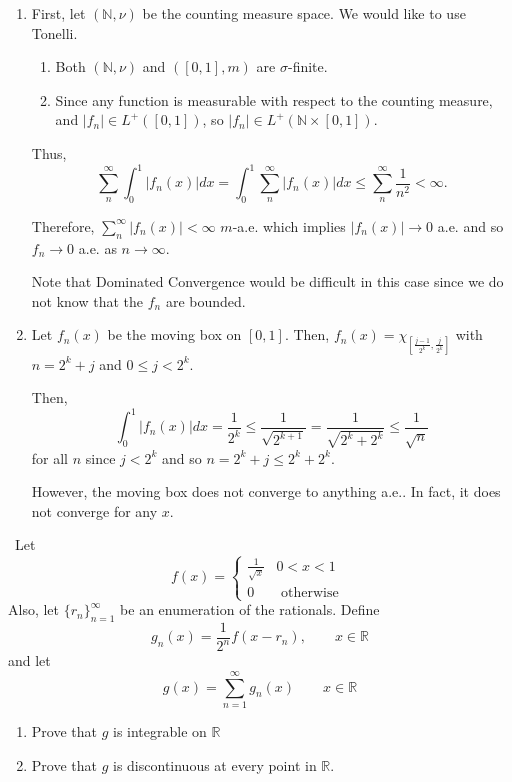 \documentclass[12pt]{Qual}
\begin{document}
\begin{solution}$\,$
\begin{enumerate}[label=(\alph*)]
    \item First, let $(\mathbb{N},\nu)$ be the counting measure space. We would like to use Tonelli.
    \begin{enumerate}
        \item Both $(\mathbb{N},\nu)$ and $([0,1],m)$ are $\sigma$-finite.
        \item Since any function is measurable with respect to the counting measure, and $|f_n|\in L^+([0,1])$, so $|f_n|\in L^+(\mathbb{N}\times[0,1])$.
    \end{enumerate}
    Thus,
    $$\sum_n^\infty\int_0^1|f_n(x)|dx=\int_0^1\sum_n^\infty|f_n(x)|dx\le\sum_n^\infty\frac{1}{n^2}<\infty.$$

    Therefore, $\sum_n^\infty|f_n(x)|<\infty$ $m$-a.e. which implies $|f_n(x)|\to 0$ a.e. and so $f_n\to0$ a.e. as $n\to\infty$.

    Note that Dominated Convergence would be difficult in this case since we do not know that the $f_n$ are bounded.

    \item Let $f_n(x)$ be the moving box on $[0,1]$. Then, $f_n(x)=\chi_{[\frac{j-1}{2^k},\frac{j}{2^k}]}$ with $n=2^k+j$ and $0\le j< 2^k$.

    Then, $$\int_0^1|f_n(x)|dx=\frac{1}{2^k}\le\frac{1}{\sqrt{2^{k+1}}}=\frac{1}{\sqrt{2^k+2^k}}\le\frac{1}{\sqrt{n}}$$ for all $n$ since $j<2^k$ and so $n=2^k+j\le 2^k+2^k$.

    However, the moving box does not converge to anything a.e.. In fact, it does not converge for any $x$.
\end{enumerate}
\end{solution}
\newpage

\begin{problem}[Folland, 2.3.25, p.59] $\,$
Let \[
f(x)=\begin{cases}
\frac{1}{\sqrt{x}} & 0<x<1\\
0 & \text{ otherwise }
\end{cases}
\]
Also, let $\{r_n\}_{n=1}^\infty$ be an enumeration of the rationals. Define $$g_n(x)=\frac{1}{2^n}f(x-r_n),\qquad x\in\mathbb{R}$$ and let $$g(x)=\sum_{n=1}^\infty g_n(x)\qquad x\in\mathbb{R}$$
\begin{enumerate}[label=(\alph*)]
    \item Prove that $g$ is integrable on $\mathbb{R}$
    \item Prove that $g$ is discontinuous at every point in $\mathbb{R}$.
\end{enumerate}
\end{problem}
\end{document}
